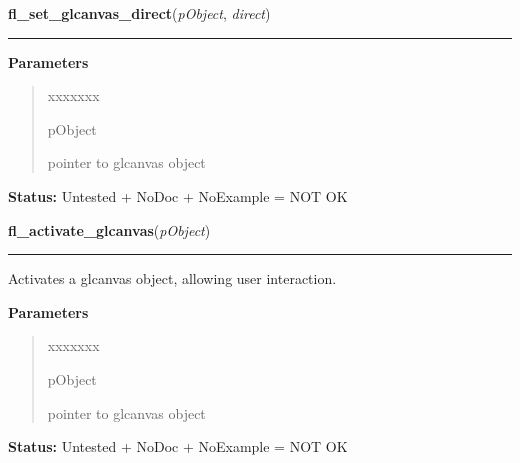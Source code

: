 \hspace{.8\funcindent}\begin{boxedminipage}{\funcwidth}

    \raggedright \textbf{fl\_set\_glcanvas\_direct}(\textit{pObject}, \textit{direct})

    \vspace{-1.5ex}

    \rule{\textwidth}{0.5\fboxrule}
\setlength{\parskip}{2ex}
\setlength{\parskip}{1ex}
      \textbf{Parameters}
      \vspace{-1ex}

      \begin{quote}
        \begin{Ventry}{xxxxxxx}

          \item[pObject]

          pointer to glcanvas object

        \end{Ventry}

      \end{quote}

\textbf{Status:} Untested + NoDoc + NoExample = NOT OK



    \end{boxedminipage}

    \label{xformslib:library:fl_activate_glcanvas}

    \vspace{0.5ex}

\hspace{.8\funcindent}\begin{boxedminipage}{\funcwidth}

    \raggedright \textbf{fl\_activate\_glcanvas}(\textit{pObject})

    \vspace{-1.5ex}

    \rule{\textwidth}{0.5\fboxrule}
\setlength{\parskip}{2ex}
    Activates a glcanvas object, allowing user interaction.

\setlength{\parskip}{1ex}
      \textbf{Parameters}
      \vspace{-1ex}

      \begin{quote}
        \begin{Ventry}{xxxxxxx}

          \item[pObject]

          pointer to glcanvas object

        \end{Ventry}

      \end{quote}

\textbf{Status:} Untested + NoDoc + NoExample = NOT OK



    \end{boxedminipage}


